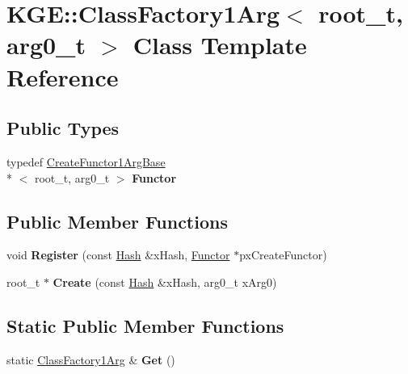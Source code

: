 \hypertarget{class_k_g_e_1_1_class_factory1_arg}{\section{K\-G\-E\-:\-:Class\-Factory1\-Arg$<$ root\-\_\-t, arg0\-\_\-t $>$ Class Template Reference}
\label{class_k_g_e_1_1_class_factory1_arg}
}
\subsection*{Public Types}
\begin{DoxyCompactItemize}
\item 
\hypertarget{class_k_g_e_1_1_class_factory1_arg_a117754bb49ee78af4ef3afe6f1a027f5}{typedef \hyperlink{class_k_g_e_1_1_create_functor1_arg_base}{Create\-Functor1\-Arg\-Base}\\*
$<$ root\-\_\-t, arg0\-\_\-t $>$ {\bfseries Functor}}\label{class_k_g_e_1_1_class_factory1_arg_a117754bb49ee78af4ef3afe6f1a027f5}

\end{DoxyCompactItemize}
\subsection*{Public Member Functions}
\begin{DoxyCompactItemize}
\item 
\hypertarget{class_k_g_e_1_1_class_factory1_arg_adc88101022205a659013c7baec4c763c}{void {\bfseries Register} (const \hyperlink{class_k_g_e_1_1_hash}{Hash} \&x\-Hash, \hyperlink{class_k_g_e_1_1_create_functor1_arg_base}{Functor} $\ast$px\-Create\-Functor)}\label{class_k_g_e_1_1_class_factory1_arg_adc88101022205a659013c7baec4c763c}

\item 
\hypertarget{class_k_g_e_1_1_class_factory1_arg_a8b6263282af1aa3f01807f7336a1567d}{root\-\_\-t $\ast$ {\bfseries Create} (const \hyperlink{class_k_g_e_1_1_hash}{Hash} \&x\-Hash, arg0\-\_\-t x\-Arg0)}\label{class_k_g_e_1_1_class_factory1_arg_a8b6263282af1aa3f01807f7336a1567d}

\end{DoxyCompactItemize}
\subsection*{Static Public Member Functions}
\begin{DoxyCompactItemize}
\item 
\hypertarget{class_k_g_e_1_1_class_factory1_arg_aaf4b86eafc6993010e01267805b78217}{static \hyperlink{class_k_g_e_1_1_class_factory1_arg}{Class\-Factory1\-Arg} \& {\bfseries Get} ()}\label{class_k_g_e_1_1_class_factory1_arg_aaf4b86eafc6993010e01267805b78217}

\end{DoxyCompactItemize}
